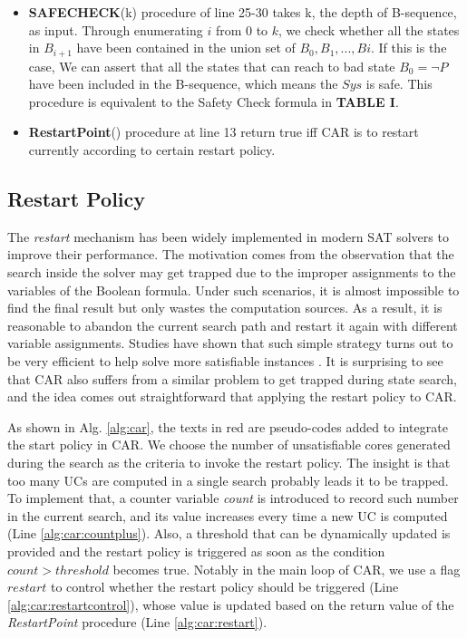 \begin{itemize}
    \item \textbf{SAFECHECK}(k) procedure of line 25-30 takes k, the depth of B-sequence, as input. Through enumerating $i$ from $0$ to $k$, we check whether all the states in $B_{i+1}$ have been contained in the union set of $B_{0},B_{1},...,B{i}$. If this is the case, We can assert that all the states that can reach to bad state $B_{0}=\neg P$ have been included in the B-sequence, which means the $Sys$ is safe. This procedure is equivalent to the Safety Check formula in \textbf{TABLE I}.
    \item \textbf{RestartPoint}() procedure at line 13 return true iff CAR is to restart currently according to certain restart policy.
    \fi
\end{itemize}

\subsection{Restart Policy}

The \emph{restart} mechanism has been widely implemented in modern SAT solvers to improve their performance. The motivation comes from the observation that the search inside the solver may get trapped due to the improper assignments to the variables of the Boolean formula. Under such scenarios, it is almost impossible to find the final result  but only wastes the computation sources. As a result, it is reasonable to abandon the current search path and restart it again with different variable assignments. Studies have shown that such simple strategy turns out to be very efficient to help solve more satisfiable instances \cite{Biere08}. It is surprising to see that CAR also suffers from a similar problem to get trapped during state search, and the idea comes out straightforward that  applying the restart policy to CAR.

As shown in Alg. \ref{alg:car}, the texts in red are pseudo-codes added to integrate the start policy in CAR. We choose the number of unsatisfiable cores generated during the search as the criteria to invoke the restart policy. The insight is that too many UCs are computed in a single search probably leads it to be trapped. To implement that, a counter variable \emph{count} is introduced to record such number in the current search, and its value increases every time a new UC is computed (Line \ref{alg:car:countplus}). Also, a threshold that can be dynamically updated is provided  and the restart policy is triggered as soon as the condition $count > threshold$ becomes true. Notably in the main loop of CAR, we use a flag $restart$ to control whether the restart policy should be triggered (Line \ref{alg:car:restartcontrol}), whose value is updated based on the return value of the \emph{RestartPoint} procedure (Line \ref{alg:car:restart}).

